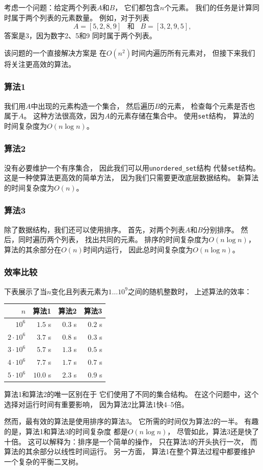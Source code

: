 考虑一个问题：给定两个列表$A$和$B$，
它们都包含$n$个元素。
我们的任务是计算同时属于两个列表的元素数量。
例如，对于列表
\[A = [5,2,8,9] \hspace{10pt} \textrm{和} \hspace{10pt} B = [3,2,9,5],\]
答案是3，因为数字2、5和9
同时属于两个列表。

该问题的一个直接解决方案是
在$O(n^2)$时间内遍历所有元素对，
但接下来我们将关注更高效的算法。

\subsubsection{算法1}

我们用$A$中出现的元素构造一个集合，
然后遍历$B$的元素，
检查每个元素是否也属于$A$。
这种方法很高效，因为$A$的元素存储在集合中。
使用\texttt{set}结构，
算法的时间复杂度为$O(n \log n)$。

\subsubsection{算法2}

没有必要维护一个有序集合，
因此我们可以用\texttt{unordered\_set}结构
代替\texttt{set}结构。
这是一种使算法更高效的简单方法，
因为我们只需要更改底层数据结构。
新算法的时间复杂度为$O(n)$。

\subsubsection{算法3}

除了数据结构，我们还可以使用排序。
首先，对两个列表$A$和$B$分别排序。
然后，同时遍历两个列表，
找出共同的元素。
排序的时间复杂度为$O(n \log n)$，
算法的其余部分在$O(n)$时间内运行，
因此总时间复杂度为$O(n \log n)$。

\subsubsection{效率比较}

下表展示了当$n$变化且列表元素为$1 \ldots 10^9$之间的随机整数时，
上述算法的效率：

\begin{center}
\begin{tabular}{rrrr}
$n$ & 算法1 & 算法2 & 算法3 \\
\hline
$10^6$ & $1.5$ s & $0.3$ s & $0.2$ s \\
$2 \cdot 10^6$ & $3.7$ s & $0.8$ s & $0.3$ s \\
$3 \cdot 10^6$ & $5.7$ s & $1.3$ s & $0.5$ s \\
$4 \cdot 10^6$ & $7.7$ s & $1.7$ s & $0.7$ s \\
$5 \cdot 10^6$ & $10.0$ s & $2.3$ s & $0.9$ s \\
\end{tabular}
\end{center}

算法1和算法2的唯一区别在于
它们使用了不同的集合结构。
在这个问题中，这个选择对运行时间有重要影响，
因为算法2比算法1快4–5倍。

然而，最有效的算法是使用排序的算法3。
它所需的时间仅为算法2的一半。
有趣的是，算法1和算法3的时间复杂度
都是$O(n \log n)$，
尽管如此，算法3还是快了十倍。
这可以解释为：排序是一个简单的操作，
只在算法3的开头执行一次，
而算法的其余部分以线性时间运行。
另一方面，
算法1在整个算法过程中都要维护
一个复杂的平衡二叉树。
